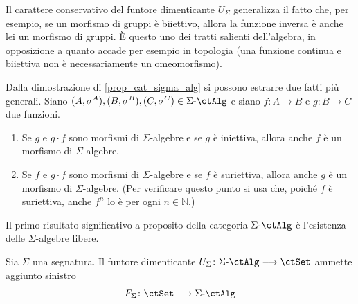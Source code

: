 Il carattere conservativo del funtore dimenticante \(U_{\Sigma}\) generalizza il fatto che, per esempio, se un morfismo di gruppi è
biiettivo, allora la funzione inversa è anche lei un morfismo di gruppi. È questo uno dei tratti salienti dell'algebra, in opposizione
a quanto accade per esempio in topologia (una funzione continua e biiettiva non è necessariamente un omeomorfismo).

\begin{remark}\label{oss_stab_morf}
 Dalla dimostrazione di \ref{prop_cat_sigma_alg} si possono estrarre due fatti più generali. Siano \((A,\sigma^A), (B, \sigma^B), (C,\sigma^C) \in \ctSAlg\) e siano \(f \colon A \to B\) e \(g \colon B \to C\) due funzioni.
 \begin{enumerate}
  \item Se \(g\) e \(g \cdot f\) sono morfismi di \(\Sigma\)-algebre e se \(g\) è iniettiva, allora anche \(f\) è un morfismo di \(\Sigma\)-algebre.
  \item Se \(f\) e \(g \cdot f\) sono morfismi di \(\Sigma\)-algebre e se \(f\) è suriettiva, allora anche \(g\) è un morfismo di \(\Sigma\)-algebre.
        (Per verificare questo punto si usa che, poiché \(f\) è suriettiva, anche \(f^n\) lo è per ogni \(n \in \mathbb N\).)
 \end{enumerate}
\end{remark}

Il primo risultato significativo a proposito della categoria \(\ctSAlg\) è l'esistenza delle \(\Sigma\)-algebre libere.

\begin{proposition}\label{prop_alg_libera}
 Sia \(\Sigma\) una segnatura. Il funtore dimenticante \(U_{\Sigma} \colon \ctSAlg \fun \ctSet\) ammette aggiunto sinistro
 \[F_{\Sigma} \colon \ctSet \fun \ctSAlg\]
\end{proposition}

